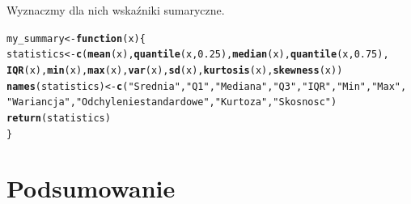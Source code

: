 \documentclass{article}\usepackage[]{graphicx}\usepackage[]{color}
\makeatletter
\newcommand{\hlnum}[1]{\textcolor[rgb]{0.686,0.059,0.569}{#1}}%
\newcommand{\hlstr}[1]{\textcolor[rgb]{0.192,0.494,0.8}{#1}}%
\newcommand{\hlstd}[1]{\textcolor[rgb]{0.345,0.345,0.345}{#1}}%
\newcommand{\hlkwa}[1]{\textcolor[rgb]{0.161,0.373,0.58}{\textbf{#1}}}%
\newcommand{\hlkwb}[1]{\textcolor[rgb]{0.69,0.353,0.396}{#1}}%
\newcommand{\hlkwc}[1]{\textcolor[rgb]{0.333,0.667,0.333}{#1}}%
\newcommand{\hlkwd}[1]{\textcolor[rgb]{0.737,0.353,0.396}{\textbf{#1}}}%
\newenvironment{kframe}{%
 \def\at@end@of@kframe{}%
 \ifinner\ifhmode%
  \def\at@end@of@kframe{\end{minipage}}%
  \begin{minipage}{\columnwidth}%
 \fi\fi%
 \def\FrameCommand##1{\hskip\@totalleftmargin \hskip-\fboxsep
 \colorbox{shadecolor}{##1}\hskip-\fboxsep
     \hskip-\linewidth \hskip-\@totalleftmargin \hskip\columnwidth}%
 \MakeFramed {\advance\hsize-\width
   \@totalleftmargin\z@ \linewidth\hsize
   \@setminipage}}%
 {\par\unskip\endMakeFramed%
 \at@end@of@kframe}
\newenvironment{knitrout}{}{} %
\makeatother
\begin{document}
Wyznaczmy dla nich wskaźniki sumaryczne.

\begin{knitrout}
\color{fgcolor}\begin{kframe}
\begin{alltt}
\hlstd{my_summary} \hlkwb{<-} \hlkwa{function}\hlstd{(}\hlkwc{x}\hlstd{) \{}
  \hlstd{statistics} \hlkwb{<-} \hlkwd{c}\hlstd{(}\hlkwd{mean}\hlstd{(x),} \hlkwd{quantile}\hlstd{(x,} \hlnum{0.25}\hlstd{),} \hlkwd{median}\hlstd{(x),} \hlkwd{quantile}\hlstd{(x,} \hlnum{0.75}\hlstd{),}
                  \hlkwd{IQR}\hlstd{(x),} \hlkwd{min}\hlstd{(x),} \hlkwd{max}\hlstd{(x),} \hlkwd{var}\hlstd{(x),} \hlkwd{sd}\hlstd{(x),} \hlkwd{kurtosis}\hlstd{(x),} \hlkwd{skewness}\hlstd{(x))}
  \hlkwd{names}\hlstd{(statistics)} \hlkwb{<-} \hlkwd{c}\hlstd{(}\hlstr{"Srednia"}\hlstd{,} \hlstr{"Q1"}\hlstd{,} \hlstr{"Mediana"}\hlstd{,} \hlstr{"Q3"}\hlstd{,} \hlstr{"IQR"}\hlstd{,} \hlstr{"Min"}\hlstd{,} \hlstr{"Max"}\hlstd{,}
                         \hlstr{"Wariancja"}\hlstd{,} \hlstr{"Odchylenie standardowe"}\hlstd{,} \hlstr{"Kurtoza"}\hlstd{,} \hlstr{"Skosnosc"}\hlstd{)}
  \hlkwd{return}\hlstd{(statistics)}
\hlstd{\}}
\end{alltt}
\end{kframe}
\end{knitrout}

\begin{table}[!h]

\caption{\label{tab:tabela_2}Wskazniki sumaryczne dla wybranych zmiennych}
\centering
{}
\end{table}



\section{Podsumowanie}
\end{document}
